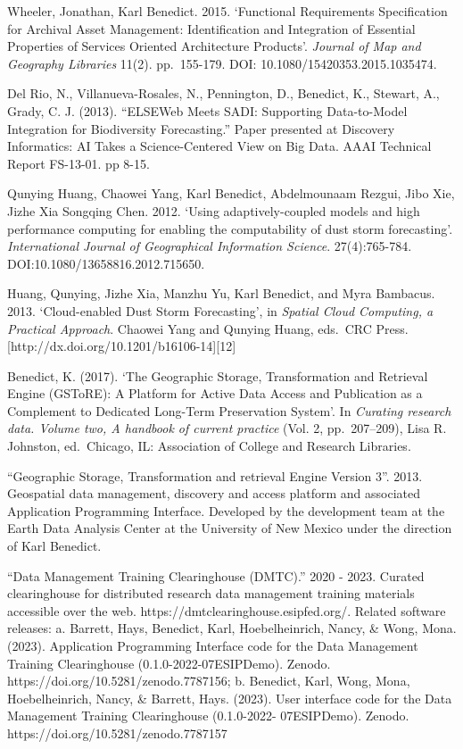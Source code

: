 \documentclass[]{article}
\begin{document}
Wheeler, Jonathan, Karl Benedict. 2015. `Functional Requirements
Specification for Archival Asset Management: Identification and
Integration of Essential Properties of Services Oriented Architecture
Products'. \emph{Journal of Map and Geography Libraries} 11(2).
pp.~155-179. DOI: 10.1080/15420353.2015.1035474.

Del Rio, N., Villanueva-Rosales, N., Pennington, D., Benedict, K.,
Stewart, A., Grady, C. J. (2013). ``ELSEWeb Meets SADI: Supporting
Data-to-Model Integration for Biodiversity Forecasting.'' Paper
presented at Discovery Informatics: AI Takes a Science-Centered View on
Big Data. AAAI Technical Report FS-13-01. pp 8-15.

Qunying Huang, Chaowei Yang, Karl Benedict, Abdelmounaam Rezgui, Jibo
Xie, Jizhe Xia Songqing Chen. 2012. `Using adaptively-coupled models and
high performance computing for enabling the computability of dust storm
forecasting'. \emph{International Journal of Geographical Information
Science}. 27(4):765-784. DOI:10.1080/13658816.2012.715650.

Huang, Qunying, Jizhe Xia, Manzhu Yu, Karl Benedict, and Myra Bambacus.
2013. `Cloud-enabled Dust Storm Forecasting', in \emph{Spatial Cloud
Computing, a Practical Approach}. Chaowei Yang and Qunying Huang,
eds.~CRC Press. {[}http://dx.doi.org/10.1201/b16106-14{]}{[}12{]}

Benedict, K. (2017). `The Geographic Storage, Transformation and
Retrieval Engine (GSToRE): A Platform for Active Data Access and
Publication as a Complement to Dedicated Long-Term Preservation System'.
In \emph{Curating research data. Volume two, A handbook of current
practice} (Vol. 2, pp.~207--209), Lisa R. Johnston, ed.~Chicago, IL:
Association of College and Research Libraries.

``Geographic Storage, Transformation and retrieval Engine Version 3''.
2013. Geospatial data management, discovery and access platform and
associated Application Programming Interface. Developed by the
development team at the Earth Data Analysis Center at the University of
New Mexico under the direction of Karl Benedict.

``Data Management Training Clearinghouse (DMTC).'' 2020 - 2023. Curated
clearinghouse for distributed research data management training
materials accessible over the web.
https://dmtclearinghouse.esipfed.org/. Related software releases: a.
Barrett, Hays, Benedict, Karl, Hoebelheinrich, Nancy, \& Wong, Mona.
(2023). Application Programming Interface code for the Data Management
Training Clearinghouse (0.1.0-2022-07ESIPDemo). Zenodo.
https://doi.org/10.5281/zenodo.7787156; b. Benedict, Karl, Wong, Mona,
Hoebelheinrich, Nancy, \& Barrett, Hays. (2023). User interface code for
the Data Management Training Clearinghouse (0.1.0-2022- 07ESIPDemo).
Zenodo. https://doi.org/10.5281/zenodo.7787157
\end{document}
